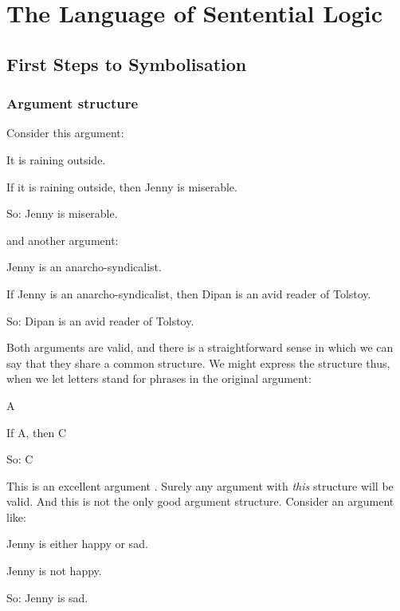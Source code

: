 \part{The Language of Sentential Logic}
\label{ch.TFL}

\chapter{First Steps to Symbolisation}\label{s:firststeps}

\section{Argument structure}\label{s:ValidityInVirtueOfForm}
Consider this argument:
	\begin{earg}
		\item[] It is raining outside.
		\item[] \textsf{If} it is raining outside, \textsf{then} Jenny is miserable.
		\item[So:] Jenny is miserable.
	\end{earg}
and another argument:
	\begin{earg}
		\item[] Jenny is an anarcho-syndicalist.
		\item[] \textsf{If} Jenny is an anarcho-syndicalist, \textsf{then} Dipan is an avid reader of Tolstoy.
		\item[So:] Dipan is an avid reader of Tolstoy.
	\end{earg}
Both arguments are valid, and there is a straightforward sense in which we can say that they share a common structure. We might express the structure thus, when we let letters stand for phrases in the original argument:
	\begin{earg}
		\item[] A
		\item[] \textsf{If} A, \textsf{then} C
		\item[So:] C
	\end{earg}
This is an excellent argument . Surely any argument with \emph{this} structure will be valid. And this is not the only good argument structure. Consider an argument like:
	\begin{earg}
		\item[] Jenny is \textsf{either} happy \textsf{or} sad.
		\item[] Jenny is \textsf{not} happy.
		\item[So:] Jenny is sad.
	\end{earg}
